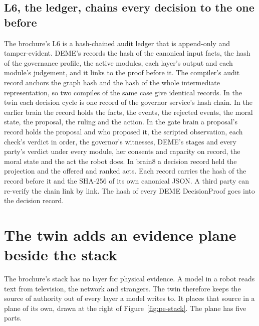 \subsection*{L6, the ledger, chains every decision to the one before}

The brochure's L6 is a hash-chained audit ledger that is append-only and tamper-evident.
DEME's  records the hash of the canonical input facts, the hash of the
governance profile, the active modules, each layer's output and each module's judgement, and it
links to the proof before it.
The compiler's audit record anchors the graph hash and the hash of the whole intermediate
representation, so two compiles of the same case give identical records.
In the twin each decision cycle is one record of the governor service's hash chain. In the earlier
brain the record holds the facts, the events, the rejected events, the moral state, the proposal,
the ruling and the action.
In the gate brain a proposal's record holds the proposal and who proposed it, the scripted
observation, each check's verdict in order, the governor's witnesses, DEME's stages and every
party's verdict under every module, her consents and capacity on record, the moral state and the
act the robot does. In brain8 a decision record held the projection and the offered and ranked
acts.
Each record carries the hash of the record before it and the SHA-256 of its own canonical JSON. A
third party can re-verify the chain link by link.
The hash of every DEME DecisionProof goes into the decision record.

\section{The twin adds an evidence plane beside the stack}\label{sec:pe-evidence}

The brochure's stack has no layer for physical evidence. A model in a robot reads text from
television, the network and strangers. The twin therefore keeps the source of authority out of
every layer a model writes to. It places that source in a plane of its own, drawn at the right of
Figure~\ref{fig:pe-stack}. The plane has five parts.

